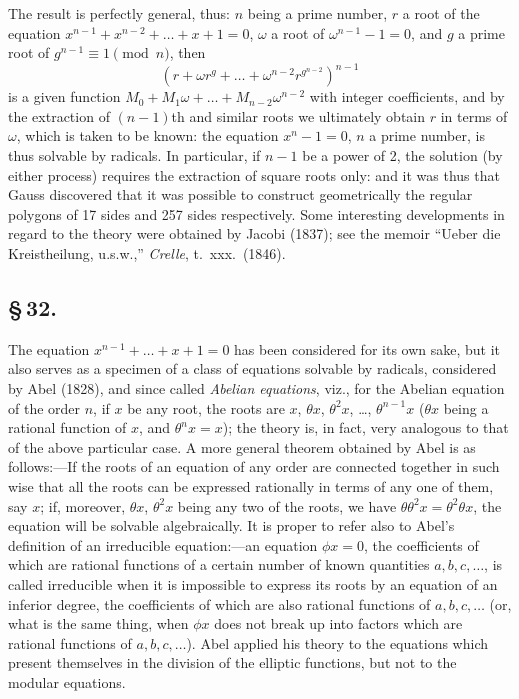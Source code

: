 \documentclass[11pt,a4paper]{article}
\begin{document}
The result is perfectly general, thus: $n$ being a prime number, $r$ a root of the equation $x^{n-1} + x^{n-2} + \ldots + x + 1 = 0$, $\omega$ a root of $\omega^{n-1} - 1 = 0$, and $g$ a prime root of $g^{n-1} \equiv 1 \pmod{n}$, then
\[
(r + \omega r^{g} + \ldots + \omega^{n-2}r^{g^{n-2}})^{n-1}
\]
is a given function $M_{0} + M_{1}\omega + \ldots + M_{n-2}\omega^{n-2}$ with integer coefficients, and by the extraction of $(n - 1)$th and similar roots we ultimately obtain $r$ in terms of $\omega$, which is taken to be known: the equation $x^{n} - 1 = 0$, $n$ a prime number, is thus solvable by radicals. In particular, if $n - 1$ be a power of 2, the solution (by either process) requires the extraction of square roots only: and it was thus that Gauss discovered that it was possible to construct geometrically the regular polygons of 17 sides and 257 sides respectively. Some interesting developments in regard to the theory were obtained by Jacobi (1837); see the memoir ``Ueber die Kreistheilung, u.s.w.,'' \textit{Crelle}, t.~xxx.\ (1846).

\subsection*{\S\,32.}

The equation $x^{n-1} + \ldots + x + 1 = 0$ has been considered for its own sake, but it also serves as a specimen of a class of equations solvable by radicals, considered by Abel (1828), and since called \textit{Abelian equations}, viz., for the Abelian equation of the order $n$, if $x$ be any root, the roots are $x$, $\theta x$, $\theta^{2}x$, \ldots, $\theta^{n-1}x$ ($\theta x$ being a rational function of $x$, and $\theta^{n}x = x$); the theory is, in fact, very analogous to that of the above particular case. A more general theorem obtained by Abel is as follows:---If the roots of an equation of any order are connected together in such wise that all the roots can be expressed rationally in terms of any one of them, say $x$; if, moreover, $\theta x$, $\theta^{2}x$ being any two of the roots, we have $\theta\theta^{2}x = \theta^{2}\theta x$, the equation will be solvable algebraically. It is proper to refer also to Abel's definition of an irreducible equation:---an equation $\phi x = 0$, the coefficients of which are rational functions of a certain number of known quantities $a, b, c, \ldots$, is called irreducible when it is impossible to express its roots by an equation of an inferior degree, the coefficients of which are also rational functions of $a, b, c, \ldots$ (or, what is the same thing, when $\phi x$ does not break up into factors which are rational functions of $a, b, c, \ldots$). Abel applied his theory to the equations which present themselves in the division of the elliptic functions, but not to the modular equations.
\end{document}
